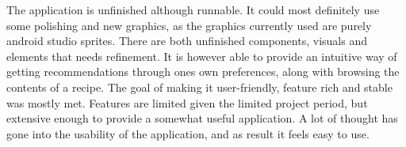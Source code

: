 The application is unfinished although runnable. It could most definitely use some polishing and new graphics, as the graphics currently used are purely android studio sprites. There are both unfinished components, visuals and elements that needs refinement. It is however able to provide an intuitive way of getting recommendations through ones own preferences, along with browsing the contents of a recipe. The goal of making it user-friendly, feature rich and stable was mostly met. Features are limited given the limited project period, but extensive enough to provide a somewhat useful application. A lot of thought has gone into the usability of the application, and as result it feels easy to use.



